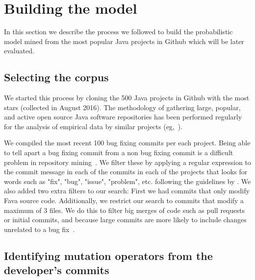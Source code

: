\documentclass[conference]{IEEEtran}
\begin{document}
\section{Building the model} \label{buildingTheModel}
In this section we describe the process we followed to build the probabilistic model mined from the most popular Java projects in Github which will be later evaluated.

\subsection{Selecting the corpus}
We started this process by cloning the 500 Java projects in Github 
with the most stars (collected in August 2016). The methodology of 
gathering large,
popular, and active open source Java software repositories has been performed 
regularly for the analysis of empirical data by similar projects (eg,~\cite{Ray14}). 

We compiled the most recent 100 bug fixing commits per each project. Being able to tell apart a bug fixing commit from a non bug fixing commit is a difficult problem in repository mining~\cite{Bird09}. We filter these by applying a regular expression to the commit message in each of the commits in each of the projects that looks for words such as "fix", "bug", "issue", "problem", etc. following the guidelines by \cite{schroter06,Cubranic05,Fischer03}.
We also added two extra filters to our search: First we had commits that only 
modify Fava source code.  Additionally, we restrict our search to commits 
that modify a maximum of 3 files. We do this to
filter big merges of code such as pull requests or initial commits, and because
large commits are more likely to include changes unrelated to a bug fix~\cite{Dias15,Herzig13,Matsuda15,Kawrykow11}.

\subsection{Identifying mutation operators from the developer's commits}
\end{document}
